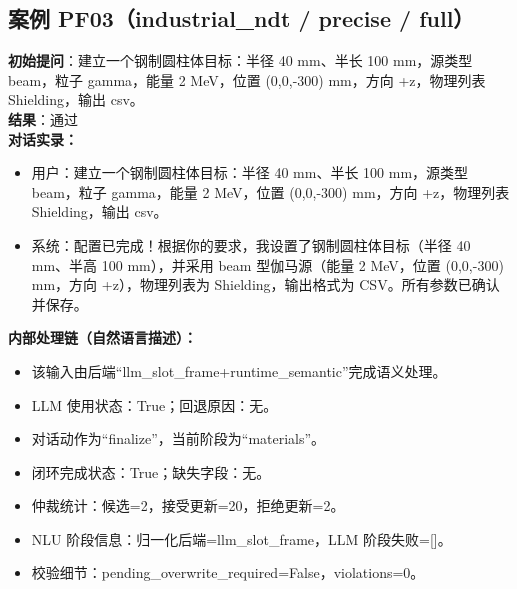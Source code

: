 \documentclass[11pt]{ctexart}
\begin{document}
\subsection{案例 PF03（industrial\_ndt / precise / full）}
\textbf{初始提问}：建立一个钢制圆柱体目标：半径 40 mm、半长 100 mm，源类型 beam，粒子 gamma，能量 2 MeV，位置 (0,0,-300) mm，方向 +z，物理列表 Shielding，输出 csv。\\
\textbf{结果}：通过\\
\textbf{对话实录：}
\begin{itemize}
\item 用户：建立一个钢制圆柱体目标：半径 40 mm、半长 100 mm，源类型 beam，粒子 gamma，能量 2 MeV，位置 (0,0,-300) mm，方向 +z，物理列表 Shielding，输出 csv。
\item 系统：配置已完成！根据你的要求，我设置了钢制圆柱体目标（半径 40 mm、半高 100 mm），并采用 beam 型伽马源（能量 2 MeV，位置 (0,0,-300) mm，方向 +z），物理列表为 Shielding，输出格式为 CSV。所有参数已确认并保存。
\end{itemize}
\textbf{内部处理链（自然语言描述）：}
\begin{itemize}
\item 该输入由后端“llm\_slot\_frame+runtime\_semantic”完成语义处理。
\item LLM 使用状态：True；回退原因：无。
\item 对话动作为“finalize”，当前阶段为“materials”。
\item 闭环完成状态：True；缺失字段：无。
\item 仲裁统计：候选=2，接受更新=20，拒绝更新=2。
\item NLU 阶段信息：归一化后端=llm\_slot\_frame，LLM 阶段失败=[]。
\item 校验细节：pending\_overwrite\_required=False，violations=0。
\end{itemize}
\end{document}
